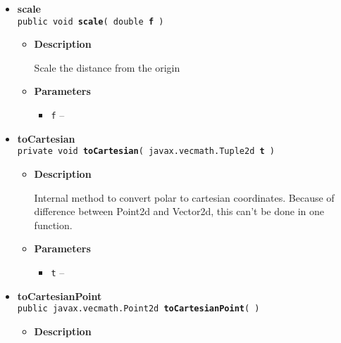 {{{\begin{itemize}
{\begin{itemize}
{Create polar coordinates out of a cartesian coordinates tuple.
}
\item{
{\bf Parameters}
  \begin{itemize}
   \item{
{\tt t} -- }
  \end{itemize}
}%
\item{{\bf Returns} -- 
the polar coordinates equal to the input tuple 
}%
\end{itemize}
}%
 \item{ 
{\bf scale}\\
{\tt public void\ {\bf scale}( {\tt double} {\bf f} )
\label{amber.common.Polar2d.scale(double)}}%
\begin{itemize}
\item{
{\bf Description}

Scale the distance from the origin
}
\item{
{\bf Parameters}
  \begin{itemize}
   \item{
{\tt f} -- }
  \end{itemize}
}%
\end{itemize}
}%
 \item{ 
{\bf toCartesian}\\
{\tt private void\ {\bf toCartesian}( {\tt javax.vecmath.Tuple2d} {\bf t} )
\label{amber.common.Polar2d.toCartesian(javax.vecmath.Tuple2d)}}%
\begin{itemize}
\item{
{\bf Description}

Internal method to convert polar to cartesian coordinates. Because of difference between Point2d and Vector2d, this can't be done in one function.
}
\item{
{\bf Parameters}
  \begin{itemize}
   \item{
{\tt t} -- }
  \end{itemize}
}%
\end{itemize}
}%
 \item{ 
{\bf toCartesianPoint}\\
{\tt public javax.vecmath.Point2d\ {\bf toCartesianPoint}(  )
\label{amber.common.Polar2d.toCartesianPoint()}}%
\begin{itemize}
\item{
{\bf Description}

}
\end{itemize}}
\end{itemize}}}}
